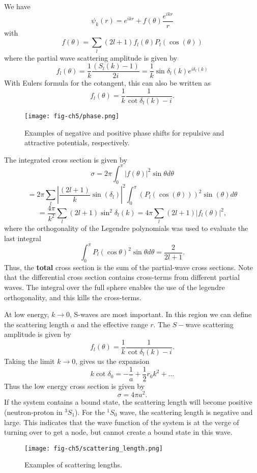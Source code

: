 \documentclass[graybox,sectrefs,envcountresetchap,open=right]{svmonodo}
\begin{document}
We have
\[
\psi_k(r) = e^{ikr} + f(\theta) \frac{e^{ikr}}{r}
\]
with 
\[
f(\theta) = \sum_l (2l+1)f_l(\theta) P_l(\cos(\theta))
\]
where the partial wave scattering amplitude is given by
\[
f_l(\theta) = \frac{1}{k}\frac{(S_l(k)-1)}{2i} = \frac{1}{k}\sin\delta_l(k) e^{i\delta_l(k)}
\]
With Eulers formula for the cotangent, this can also be written as
\[
f_l(\theta) = \frac{1}{k}\frac{1}{\cot \delta_l(k) - i}.
\]


\begin{figure}[t]
  \centerline{\texttt{[image: fig-ch5/phase.png]}}
  \caption{
  Examples of negative and positive phase shifts for repulsive and attractive potentials, respectively.
  }
\end{figure}



The integrated cross section is given by
\[
\sigma = 2\pi \int_0^{\pi} |f(\theta)|^2 \sin \theta d\theta 
\]
\[
=2\pi \sum_l |\frac{(2l+1)}{k} \sin(\delta_l)|^2 \int_0^{\pi} (P_l(\cos(\theta)))^2 \sin(\theta) d\theta\]
\[ 
= \frac{4\pi}{k^2} \sum_l (2l+1) \sin^2\delta_l(k) = 4\pi \sum_l (2l+1)|f_l(\theta)|^2, 
\]
where the orthogonality of the Legendre polynomials was used to evaluate the last integral
\[
\int_0^{\pi} P_l(\cos \theta)^2 \sin \theta d\theta = \frac{2}{2l+1}.
\]
Thus, the \textbf{total} cross section is the sum of the partial-wave cross sections. Note that the differential cross section contains cross-terms from different partial waves. The integral over the full sphere enables the use of the legendre orthogonality, and this kills the cross-terms.




At low energy, $k \rightarrow 0$, S-waves are most important. In this region we can define the scattering length $a$ and the effective range $r$. The $S-$wave scattering amplitude is given by
\[
f_l(\theta) = \frac{1}{k}\frac{1}{\cot \delta_l(k) - i}.
\]
Taking the limit $k \rightarrow 0$, gives us the expansion
\[
k \cot \delta_0 = -\frac{1}{a} + \frac{1}{2}r_0 k^2 + \ldots
\]
Thus the low energy cross section is given by
\[
\sigma = 4\pi a^2.
\]
If the system contains a bound state, the scattering length will become positive (neutron-proton in $^3S_1$). For the $^1S_0$ wave, the scattering length is negative and large. This indicates that the wave function of the system is at the verge of turning over to get a node, but cannot create a bound state in this wave.




\begin{figure}[t]
  \centerline{\texttt{[image: fig-ch5/scattering\_length.png]}}
  \caption{
  Examples of scattering lengths.
  }
\end{figure}
\end{document}
